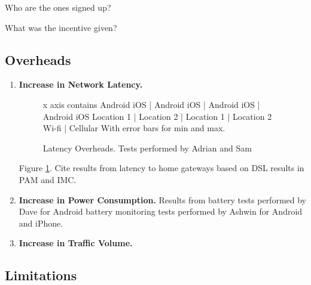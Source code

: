 Who are the ones signed up?

What was the incentive given?

\subsection{Overheads}

\begin{enumerate}

\item \textbf{Increase in Network Latency.}

\begin{figure}
\artbd{}
x axis contains 
Android iOS | Android iOS | Android iOS | Android iOS  \newline
 Location 1 |  Location 2 |  Location 1 | Location 2 \newline
           Wi-fi          |         Cellular         
With error bars for min and max.
\caption{Latency Overheads. Tests performed by Adrian and Sam}
\label{fig:latency}
\end{figure}

Figure \ref{fig:latency}.
Cite results from latency to home gateways based on DSL results in PAM and IMC. 

\item \textbf{Increase in Power Consumption.}
Results from battery tests performed by Dave for Android
battery monitoring tests performed by Ashwin for Android and iPhone. 

\item \textbf{Increase in Traffic Volume.}
\end{enumerate}

\subsection{Limitations}

